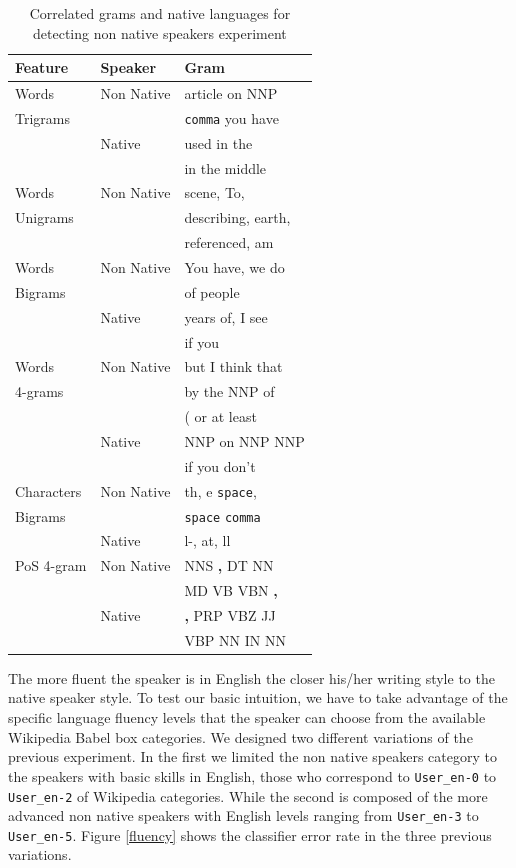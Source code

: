 \documentclass[11pt]{article}
\begin{document}
\begin{table}[htp]
\begin{tabular}{l|ll}
	\textbf{Feature} & \textbf{Speaker}  & \textbf{Gram}
	\\\hline
	Words & Non Native &article on NNP\\
	 Trigrams& &  \verb+comma+ you have\\
	 & Native& used in the\\
	 &  &in the middle\\\hline
	 
	Words &Non Native& scene, To,\\
	   Unigrams&&describing, earth,\\
	    && referenced, am\\\hline
	    
	Words 	&Non Native& You have, we do\\
	Bigrams&& of people\\
	&Native& years of, I see\\
	&&if you\\\hline

	Words &Non Native& but I think that\\
	4-grams	&&by the NNP of\\
		&&( or at least\\
		&Native&NNP on NNP NNP\\
		&&if you don't\\\hline

	Characters&Non Native& th, e \verb+space+,\\
	Bigrams && \verb+space+ \verb+comma+\\
	&Native& l-, at, ll\\\hline
	
	PoS 4-gram &Non Native& NNS \textbf{,} DT NN\\
	&& MD VB VBN \textbf{,}\\
	&Native& \textbf{,} PRP VBZ JJ\\
	&& VBP NN IN NN\\
	
\end{tabular}
\label{table:nonnative}
\caption{Correlated grams and native languages for detecting non native speakers experiment}
\end{table}

The more fluent the speaker is in English the closer his/her writing
style to the native speaker style. To test our basic intuition,
we have to take advantage of the specific language fluency levels that the speaker can choose
from the available Wikipedia Babel box categories. We designed two different
variations of the previous experiment. In the first we limited
the non native speakers category to the speakers with basic skills in English,
those who correspond to \verb+User_en-0+ to \verb+User_en-2+ of Wikipedia categories.
While the second is composed of the more advanced non native speakers with
English levels ranging from \verb+User_en-3+ to \verb+User_en-5+.
Figure \ref{fluency} shows the classifier error rate in the three previous
variations.
\end{document}
